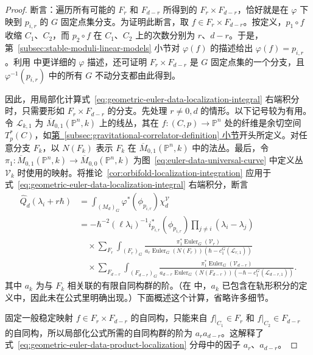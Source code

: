 \begin{proof}
断言：遍历所有可能的 $F_r$ 和 $F_{d-r}$ 所得到的 $F_r\times F_{d-r}$，恰好就是在 $\varphi$ 下映到 $p_{i,r}$ 的 $G$ 固定点集分支。为证明此断言，取 $f\in F_r\times F_{d-r}$。按定义，$p_1\circ f$ 收缩 $C_1$、$C_2$，而 $p_2\circ f$ 在 $C_1$、$C_2$ 上的次数分别为 $r$、$d-r$。于是，第~\ref{subsec:stable-moduli-linear-models} 小节对 $\varphi(f)$ 的描述给出 $\varphi(f)=p_{i,r}$。利用  中更详细的 $\varphi$ 描述，还可证明 $F_r\times F_{d-r}$ 是 $G$ 固定点集的一个分支，且 $\varphi^{-1}(p_{i,r})$ 中的所有 $G$ 不动分支都由此得到。

因此，用局部化计算式~\eqref{eq:geometric-euler-data-localization-integral} 右端积分时，只需要形如 $F_r\times F_{d-r}$ 的分支。先处理 $r\ne0,d$ 的情形。以下记号较为有用。令 $\mathcal L_{k,1}$ 为 $\overline M_{0,1}(\mathbb P^n,k)$ 上的线丛，其在 $f:(C,p)\to\mathbb P^n$ 处的纤维是余切空间 $T_p^*(C)$，如\hyperref[subsec:gravitational-correlator-definition]{第~\ref*{subsec:gravitational-correlator-definition} 小节}开头所定义。对任意分支 $F_k$，以 $N(F_k)$ 表示 $F_k$ 在 $\overline M_{0,1}(\mathbb P^n,k)$ 中的法丛。最后，令 $\pi_1:\overline M_{0,1}(\mathbb P^n,k)\to\overline M_{0,0}(\mathbb P^n,k)$ 为图~\eqref{eq:euler-data-universal-curve} 中定义丛 $\mathcal V_k$ 时使用的映射。将推论~\ref{cor:orbifold-localization-integration} 应用于式~\eqref{eq:geometric-euler-data-localization-integral} 右端积分，断言
\begin{equation}\label{eq:geometric-euler-data-product-localization}
\begin{aligned}
\widehat Q_d(\lambda_i+r\hbar)
&=\int_{(M_d)_G}\varphi^*(\phi_{p_{i,r}})\chi_d^{\mathcal V}\\
&=-\hbar^{-2}(\ell\lambda_i)^{-1}i_{p_{i,r}}^*(\phi_{p_{i,r}})
\prod_{j\ne i}(\lambda_i-\lambda_j)\\
&\quad\times\sum_{F_r}\int_{(F_r)_G}
\frac{\pi_1^*\operatorname{Euler}_G(\mathcal V_r)}
{a_r\operatorname{Euler}_G(N(F_r))(\hbar-c_1^G(\mathcal L_{r,1}))}\\
&\quad\times\sum_{F_{d-r}}\int_{(F_{d-r})_G}
\frac{\pi_1^*\operatorname{Euler}_G(\mathcal V_{d-r})}
{a_{d-r}\operatorname{Euler}_G(N(F_{d-r}))(-\hbar-c_1^G(\mathcal L_{d-r,1}))}.
\end{aligned}
\end{equation}
其中 $a_k$ 为与 $F_k$ 相关联的有限自同构群的阶。（在  中，$a_k$ 已包含在轨形积分的定义中，因此未在公式里明确出现。）下面概述这个计算，省略许多细节。

固定一般稳定映射 $f\in F_r\times F_{d-r}$ 的自同构，只能来自 $f|_{C_1}\in F_r$ 和 $f|_{C_2}\in F_{d-r}$ 的自同构，所以局部化公式所需的自同构群的阶为 $a_ra_{d-r}$。这解释了式~\eqref{eq:geometric-euler-data-product-localization} 分母中的因子 $a_r$、$a_{d-r}$。


\end{proof}
